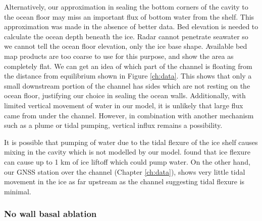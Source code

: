 Alternatively, our approximation in sealing the bottom corners of the cavity to the ocean floor may miss an important flux of bottom water from the shelf. This approximation was made in the absence of better data. Bed elevation is needed to calculate the ocean depth beneath the ice.  Radar cannot penetrate seawater so we cannot tell the ocean floor elevation, only the ice base shape. Available bed map products \citep[e.g.]{fretwell2013bedmap2} are too coarse to use for this purpose, and show the area as completely flat. 
We can get an idea of which part of the channel is floating from the distance from equilibrium shown in Figure \ref{ch:data}. This shows that only a small downstream portion of the channel has sides which are not resting on the ocean floor, justifying our choice in sealing the ocean walls. Additionally, with limited vertical movement of water in our model, it is unlikely that large flux came from under the channel. However, in combination with another mechanism such as a plume or tidal pumping, vertical influx remains a possibility.


It is possible that pumping of water due to the tidal flexure of the ice shelf causes mixing in the cavity which is not modelled by our model.  \cite{walker2013ice} found that ice flexure can cause up to 1 km of ice liftoff which could pump water. On the other hand, our GNSS station over the channel (Chapter \ref{ch:data}), shows very little tidal movement in the ice as far upstream as the channel suggesting tidal flexure is minimal. 



\subsubsection{No wall basal ablation}


